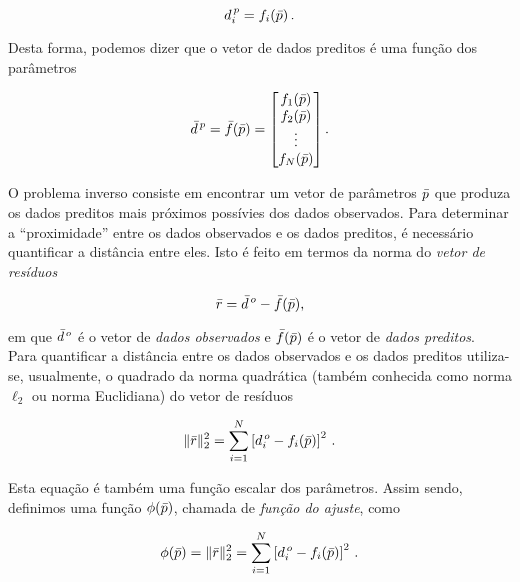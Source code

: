 \begin{equation}
d^{\thinspace p}_i = f_i(\bar{p})\thinspace.
\label{eq:fi}
\end{equation}

\noindent Desta forma, podemos dizer que o vetor de dados preditos é uma função
dos parâmetros

\begin{equation}
\bar{d}^{\thinspace p}= \bar{f}(\bar{p}) =
    \begin{bmatrix}
    f_1(\bar{p}) \\
    f_2(\bar{p}) \\
    \vdots \\
    f_N(\bar{p})
    \end{bmatrix}.
\label{eq:dados_preditos}
\end{equation}

\indent O problema inverso consiste em encontrar um vetor de parâmetros $\bar{p}$
que produza os dados preditos mais próximos possívies dos dados observados.
Para determinar a ``proximidade'' entre os dados observados e os dados preditos,
é necessário quantificar a distância entre eles.
Isto é feito em termos da norma do {\it vetor de resíduos}

\begin{equation}
\bar{r} = \bar{d}^{\thinspace o} - \bar{f}(\bar{p}),
\end{equation}

\noindent em que $\bar{d}^{\thinspace o}$ é o vetor de {\it dados observados}
e $\bar{f}(\bar{p})$ é o vetor de {\it dados preditos}.
\\
\indent Para quantificar a distância entre os dados observados e os dados
preditos utiliza-se, usualmente, o quadrado da
norma quadrática (também conhecida como norma $\ell_2$ ou norma Euclidiana)
do vetor de resíduos

\begin{equation}
\lVert\bar{r}\rVert_2^2 =
    \sum\limits_{i=1}^N \left[d^{\thinspace o}_i - f_i(\bar{p})\right]^2 \, .
\label{eq:norma_l2}
\end{equation}

\noindent Esta equação é também uma função escalar
dos parâmetros. Assim sendo, definimos uma função $\phi(\bar{p})$, chamada de
{\it função do ajuste}, como

\begin{equation}
\phi(\bar{p}) = \lVert\bar{r}\rVert_2^2 =
    \sum\limits_{i=1}^N \left[d^{\thinspace o}_i - f_i(\bar{p})\right]^2 \, .
\label{eq:ajuste_sum}
\end{equation}


